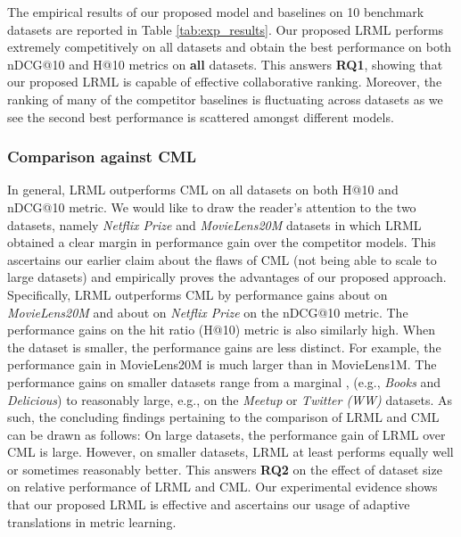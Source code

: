 \documentclass[sigconf]{acmart}
\begin{document}
The empirical results of our proposed model and baselines on 10 benchmark datasets are reported in Table \ref{tab:exp_results}. Our proposed \textsc{LRML} performs extremely competitively on all datasets and obtain the best performance on both nDCG@10 and H@10 metrics on \textbf{all} datasets. This answers \textbf{RQ1}, showing that our proposed \textsc{LRML} is capable of effective collaborative ranking. Moreover, the ranking of many of the competitor baselines is fluctuating across datasets as we see the second best performance is scattered amongst different models. 

\subsubsection{Comparison against CML}
In general, \textsc{LRML} outperforms CML on all datasets on both H@10 and nDCG@10 metric. We would like to draw the reader's attention to the two datasets, namely \textit{Netflix Prize} and \textit{MovieLens20M} datasets in which \textsc{LRML} obtained a clear margin in performance gain over the competitor models. This ascertains our earlier claim about the flaws of CML (not being able to scale to large datasets) and empirically proves the advantages of our proposed approach. Specifically, \textsc{LRML} outperforms CML by performance gains about  on \textit{MovieLens20M} and about  on \textit{Netflix Prize} on the nDCG@10 metric. The performance gains on the hit ratio (H@10) metric is also similarly high. When the dataset is smaller, the performance gains are less distinct. For example, the performance gain in MovieLens20M is much larger than in MovieLens1M. The performance gains on smaller datasets range from a marginal , (e.g., \textit{Books} and \textit{Delicious}) to reasonably large, e.g.,  on the \textit{Meetup} or \textit{Twitter (WW)} datasets. As such, the concluding findings pertaining to the comparison of \textsc{LRML} and CML can be drawn as follows: On large datasets, the performance gain of \textsc{LRML} over CML is large. However, on smaller datasets, \textsc{LRML} at least performs equally well or sometimes reasonably better. This answers \textbf{RQ2} on the effect of dataset size on relative performance of LRML and CML. Our experimental evidence shows that our proposed \textsc{LRML} is effective and ascertains our usage of adaptive translations in metric learning. 
\end{document}
